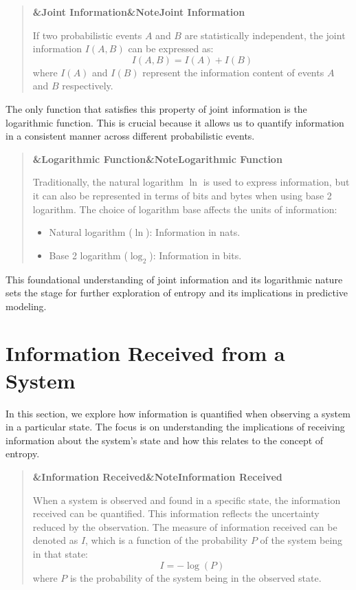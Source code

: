 \documentclass[a4paper]{article}
\newcommand{\boxheading}[1]{%
  \par\smallskip
  \noindent\textbf{\ifx&#1&Note\else#1\fi}\par
  \smallskip
}
\newenvironment{defbox}[1][]{%
  \begin{quote}\color{green!40!black}\boxheading{#1}\normalcolor
}{\end{quote}}
\newenvironment{rembox}[1][]{%
  \begin{quote}\color{black!70}\boxheading{#1}\normalcolor
}{\end{quote}}
\begin{document}
\begin{defbox}[Joint Information]
If two probabilistic events \( A \) and \( B \) are statistically independent, the joint information \( I(A, B) \) can be expressed as:
\[
I(A, B) = I(A) + I(B)
\]
where \( I(A) \) and \( I(B) \) represent the information content of events \( A \) and \( B \) respectively.
\end{defbox}

The only function that satisfies this property of joint information is the logarithmic function. This is crucial because it allows us to quantify information in a consistent manner across different probabilistic events.

\begin{rembox}[Logarithmic Function]
Traditionally, the natural logarithm \( \ln \) is used to express information, but it can also be represented in terms of bits and bytes when using base 2 logarithm. The choice of logarithm base affects the units of information:
\begin{itemize}
    \item Natural logarithm (\( \ln \)): Information in nats.
    \item Base 2 logarithm (\( \log_2 \)): Information in bits.
\end{itemize}
\end{rembox}

This foundational understanding of joint information and its logarithmic nature sets the stage for further exploration of entropy and its implications in predictive modeling.

\section{Information Received from a System}
In this section, we explore how information is quantified when observing a system in a particular state. The focus is on understanding the implications of receiving information about the system's state and how this relates to the concept of entropy.

\begin{defbox}[Information Received]
When a system is observed and found in a specific state, the information received can be quantified. This information reflects the uncertainty reduced by the observation. The measure of information received can be denoted as \( I \), which is a function of the probability \( P \) of the system being in that state:
\[
I = -\log(P)
\]
where \( P \) is the probability of the system being in the observed state.
\end{defbox}
\end{document}
